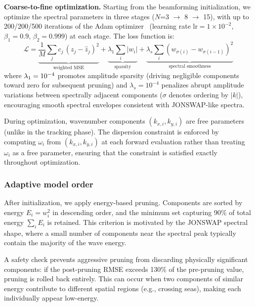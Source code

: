 \documentclass[review]{elsarticle}
\begin{document}
\textbf{Coarse-to-fine optimization.}
Starting from the beamforming initialization, we optimize the
spectral parameters in three stages ($N$=3 $\to$ 8 $\to$ 15),
with up to 200/200/500 iterations of the Adam optimizer~\citep{kingma2015}
(learning rate $\text{lr} = 1 \times 10^{-2}$,
$\beta_1 = 0.9$, $\beta_2 = 0.999$) at each stage.
The loss function is:
\begin{equation}
  \mathcal{L} = \underbrace{\frac{1}{M} \sum_j c_j \, (z_j - \hat{z}_j)^2}_{\text{weighted MSE}}
    + \underbrace{\lambda_1 \sum_i |w_i|}_{\text{sparsity}}
    + \underbrace{\lambda_s \sum_i (w_{\sigma(i)} - w_{\sigma(i-1)})^2}_{\text{spectral smoothness}}
\end{equation}
where $\lambda_1 = 10^{-4}{}$ promotes amplitude sparsity (driving
negligible components toward zero for subsequent pruning) and
$\lambda_s = 10^{-4}$ penalizes abrupt amplitude variations between
spectrally adjacent components ($\sigma$ denotes ordering by $|k|$),
encouraging smooth spectral envelopes consistent with JONSWAP-like
spectra.

During optimization, wavenumber components $(k_{x,i}, k_{y,i})$
are free parameters (unlike in the tracking phase).  The dispersion
constraint is enforced by computing $\omega_i$ from $(k_{x,i}, k_{y,i})$
at each forward evaluation rather than treating $\omega_i$ as a free
parameter, ensuring that the constraint is satisfied exactly
throughout optimization.

\subsubsection{Adaptive model order}
\label{sec:adaptive_order}

After initialization, we apply energy-based pruning.
Components are sorted by energy $E_i = w_i^2$ in descending order,
and the minimum set capturing 90\% of total energy
$\sum_i E_i$ is retained.  This criterion is motivated by the
JONSWAP spectral shape, where a small number of components near the
spectral peak typically contain the majority of the wave energy.

A safety check prevents aggressive pruning from discarding physically
significant components: if the post-pruning RMSE exceeds
130\% of the pre-pruning value, pruning is rolled back entirely.
This can occur when two components of similar energy
contribute to different spatial regions (e.g., crossing seas),
making each individually appear low-energy.
\end{document}
